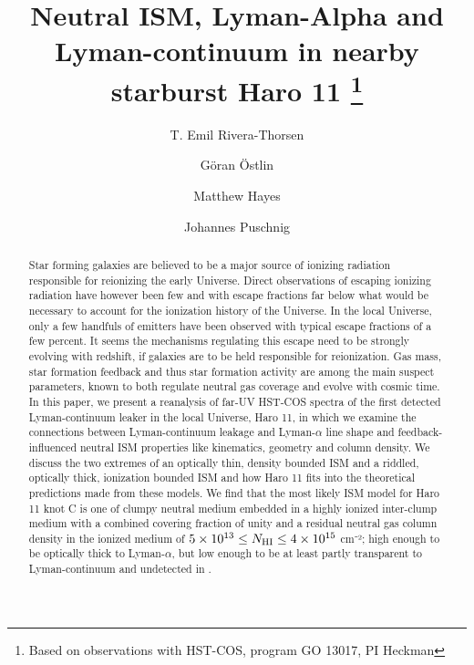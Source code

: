 \documentclass[twocolumn]{aastex61}
\begin{document}
\title{Neutral ISM, Lyman-Alpha and Lyman-continuum in nearby starburst Haro 11
		                    \footnote{Based on observations with HST-COS, program GO 13017, PI Heckman}
	            }


\author{T. Emil Rivera-Thorsen}
\author{Göran Östlin}
\author{Matthew Hayes}
\author{Johannes Puschnig}


\begin{abstract}
Star forming galaxies are believed to be a major source of ionizing
radiation responsible for reionizing the early Universe. Direct
observations of escaping ionizing radiation have however been few and
with escape fractions far below what would be necessary to account for
the ionization history of the Universe. In the local Universe, only a
few handfuls of emitters have been observed with typical escape
fractions of a few percent. It seems the mechanisms regulating this
escape need to be strongly evolving with redshift, if galaxies are to be
held responsible for reionization. Gas mass, star formation feedback and
thus star formation activity are among the main suspect parameters,
known to both regulate neutral gas coverage and evolve with cosmic time.
In this paper, we present a reanalysis of far-UV HST-COS spectra of the
first detected Lyman-continuum leaker in the local Universe, Haro 11, in
which we examine the connections between Lyman-continuum leakage and
Lyman-$\alpha$ line shape and feedback-influenced neutral ISM properties
like kinematics, geometry and column density. We discuss the two
extremes of an optically thin, density bounded ISM and a riddled,
optically thick, ionization bounded ISM and how Haro 11 fits into the
theoretical predictions made from these models. We find that the most
likely ISM model for Haro 11 knot C is one of clumpy neutral medium
embedded in a highly ionized inter-clump medium with a combined covering
fraction of unity and a residual neutral gas column density in the
ionized medium of
$5 \times 10^{13} \leq N_{\rm HI} \leq 4 \times 10^{15}$ cm⁻²; high
enough to be optically thick to Lyman-$\alpha$, but low enough to be at
least partly transparent to Lyman-continuum and undetected in
.
\end{abstract}
\end{document}
